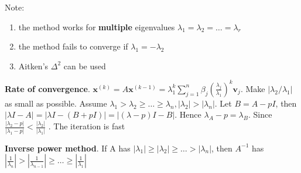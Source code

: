 \documentclass[11pt]{article}
\newcommand{\bl}[1] {\boldsymbol{#1}}
\begin{document}
Note:
\begin{enumerate}
\item the method works for \textbf{multiple} eigenvalues
\(\lambda_1=\lambda_2=\dots=\lambda_r\)
\item the method fails to converge if \(\lambda_1=-\lambda_2\)
\item Aitken's \(\Delta^2\) can be used
\end{enumerate}


\textbf{Rate of convergence}. \(\bl{x}^{(k)}=A\bl{x}^{(k-1)}=\lambda_1^k
   \displaystyle\sum_{j=1}^n\beta_j(\frac{\lambda_j}{\lambda_1})^k\bl{v}_j\).
Make \(|\lambda_2/\lambda_1|\) as small as possible.
Assume \(\lambda_1>\lambda_2\ge\dots\ge\lambda_n, |\lambda_2|>|\lambda_n|\).
Let \(B=A-pI\), then \(|\lambda I-A|=|\lambda I-(B+pI)|=|(\lambda-p)I-B|\).
Hence \(\lambda_A-p=\lambda_B\). Since  \(\frac{|\lambda_2-p|}{|\lambda_1-p|}<
   \frac{|\lambda_2|}{|\lambda_1|}\) . The iteration is fast


\textbf{Inverse power method}. If A has
 \(|\lambda_1|\ge|\lambda_2|\ge\dots>|\lambda_n|\), then \(A^{-1}\) has
 \(|\frac{1}{\lambda_n}|>| \frac{1}{\lambda_{n-1}}|\ge\dots\ge|
    \frac{1}{\lambda_1}|\) 
\end{document}
